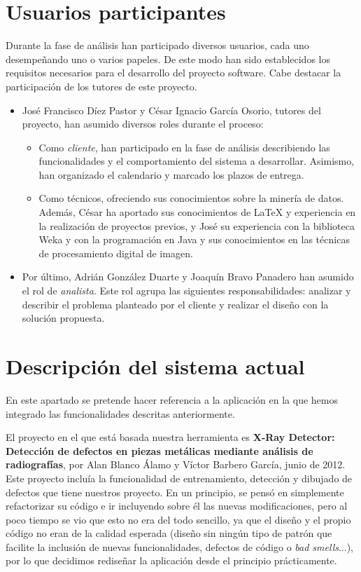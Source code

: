 \section{Usuarios participantes}
Durante la fase de análisis han participado diversos usuarios, cada uno desempeñando uno o varios papeles. De este modo han sido establecidos los requisitos necesarios para el desarrollo del proyecto software. Cabe destacar la participación de los tutores de este proyecto.
\begin{itemize}
 \item José Francisco Díez Pastor y César Ignacio García Osorio, tutores del proyecto, han asumido diversos roles durante el proceso:
 \begin{itemize}
  \item Como \textit{cliente}, han participado en la fase de análisis describiendo las funcionalidades y el comportamiento del sistema a desarrollar. Asimismo, han organizado el calendario y marcado los plazos de entrega.
  \item Como técnicos, ofreciendo sus conocimientos sobre la minería de datos. Además, César ha aportado sus conocimientos de LaTeX y experiencia en la realización de proyectos previos, y José su experiencia con la biblioteca Weka y con la programación en Java y sus conocimientos en las técnicas de procesamiento digital de imagen.
 \end{itemize}
 \item Por último, Adrián González Duarte y Joaquín Bravo Panadero han asumido el rol de \textit{analista}. Este rol agrupa las siguientes responsabilidades: analizar y describir el problema planteado por el cliente y realizar el diseño con la solución propuesta.
\end{itemize}


\section{Descripción del sistema actual}
En este apartado se pretende hacer referencia a la aplicación en la que hemos integrado las funcionalidades descritas anteriormente.

El proyecto en el que está basada nuestra herramienta es \textbf{X-Ray Detector: Detección de defectos en piezas metálicas mediante análisis de radiografías}, por Alan Blanco Álamo y Víctor Barbero García, junio de 2012. Este proyecto incluía la funcionalidad de entrenamiento, detección y dibujado de defectos que tiene nuestros proyecto. En un principio, se pensó en simplemente refactorizar su código e ir incluyendo sobre él las nuevas modificaciones, pero al poco tiempo se vio que esto no era del todo sencillo, ya que el diseño y el propio código no eran de la calidad esperada (diseño sin ningún tipo de patrón que facilite la inclusión de nuevas funcionalidades, defectos de código o \textit{bad smells}...), por lo que decidimos rediseñar la aplicación desde el principio prácticamente.


